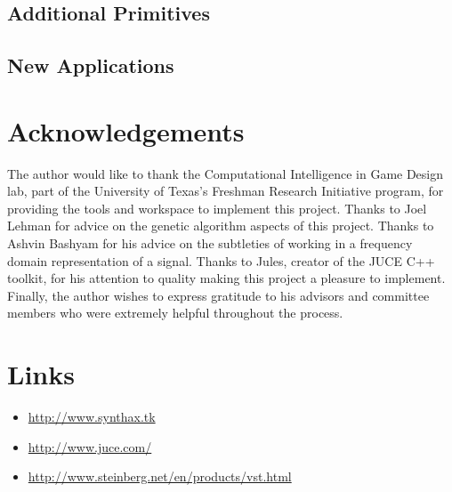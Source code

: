 \documentclass[12pt]{article}
\begin{document}
\subsection{Additional Primitives}\label{FUTUREPRIMITIVES}
\subsection{New Applications}\label{FUTUREAPPLICATIONS}

\section{Acknowledgements}
The author would like to thank the Computational Intelligence in Game Design lab, part of the University of Texas's Freshman Research Initiative program, for providing the tools and workspace to implement this project. Thanks to Joel Lehman for advice on the genetic algorithm aspects of this project. Thanks to Ashvin Bashyam for his advice on the subtleties of working in a frequency domain representation of a signal. Thanks to Jules, creator of the JUCE C++ toolkit, for his attention to quality making this project a pleasure to implement. Finally, the author wishes to express gratitude to his advisors and committee members who were extremely helpful throughout the process.

\section{Links}
\begin{itemize}
\item{\url{http://www.synthax.tk}}
\item{\url{http://www.juce.com/}}
\item{\url{http://www.steinberg.net/en/products/vst.html}}
\end{itemize}



\end{document}

